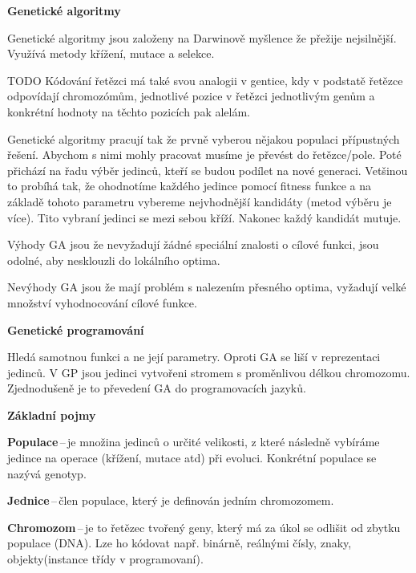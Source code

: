 \begin{Large}\vspace{0,5cm} \textbf{Genetické algoritmy}
\end{Large}

Genetické algoritmy jsou založeny na Darwinově myšlence že přežije nejsilnější. Využívá metody křížení, mutace a selekce.

TODO Kódování řetězci má také svou analogii v gentice, kdy v podstatě řetězce odpovídají chromozómům, jednotlivé pozice v řetězci jednotlivým genům a konkrétní hodnoty na těchto pozicích pak alelám.

Genetické algoritmy pracují tak že prvně vyberou nějakou populaci přípustných řešení. Abychom s nimi mohly pracovat musíme je převést do řetězce/pole. Poté přichází na řadu výběr jedinců, kteří se budou podílet na nové generaci. Vetšinou to probíhá tak, že ohodnotíme každého jedince pomocí fitness funkce a na základě tohoto parametru vybereme nejvhodnější kandidáty (metod výběru je více). Tito vybraní jedinci se mezi sebou kříží. Nakonec každý kandidát mutuje. 

Výhody GA jsou že nevyžadují žádné speciální znalosti o cílové funkci, jsou odolné, aby nesklouzli do lokálního optima.

Nevýhody GA jsou že mají problém s nalezením přesného optima, vyžadují velké množství vyhodnocování cílové funkce.

\begin{Large}\vspace{0,5cm} \textbf{Genetické programování}
\end{Large}

Hledá samotnou funkci a ne její parametry. Oproti GA se liší v reprezentaci jedinců. V GP jsou jedinci vytvořeni stromem s proměnlivou délkou chromozomu. Zjednodušeně je to převedení GA do programovacích jazyků.

\begin{Large}\vspace{0,5cm} \textbf{Základní pojmy}
\end{Large}

\textbf{Populace}\,--\,je množina jedinců o určité velikosti, z které následně vybíráme jedince na operace (křížení, mutace atd) při evoluci. Konkrétní populace se nazývá genotyp. 

\textbf{Jednice}\,--\,člen populace, který je definován jedním chromozomem.

\textbf{Chromozom}\,--\,je to řetězec tvořený geny, který má za úkol se odlišit od zbytku populace (DNA). Lze ho kódovat např. binárně, reálnými čísly, znaky, objekty(instance třídy v programovaní).

